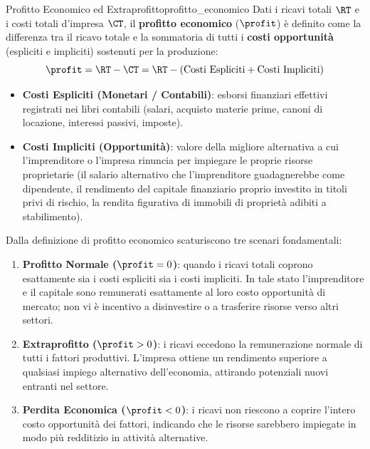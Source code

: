\begin{definizione}{Profitto Economico ed Extraprofitto}{profitto_economico}
Dati i ricavi totali $\RT$ e i costi totali d'impresa $\CT$, il \textbf{profitto economico} ($\profit$) è definito come la differenza tra il ricavo totale e la sommatoria di tutti i \textbf{costi opportunità} (espliciti e impliciti) sostenuti per la produzione:
\begin{equation}
    \profit = \RT - \CT = \RT - (\text{Costi Espliciti} + \text{Costi Impliciti})
\end{equation}
\begin{itemize}
    \item \textbf{Costi Espliciti (Monetari / Contabili)}: esborsi finanziari effettivi registrati nei libri contabili (salari, acquisto materie prime, canoni di locazione, interessi passivi, imposte).
    \item \textbf{Costi Impliciti (Opportunità)}: valore della migliore alternativa a cui l'imprenditore o l'impresa rinuncia per impiegare le proprie risorse proprietarie (il salario alternativo che l'imprenditore guadagnerebbe come dipendente, il rendimento del capitale finanziario proprio investito in titoli privi di rischio, la rendita figurativa di immobili di proprietà adibiti a stabilimento).
\end{itemize}
\end{definizione}

\begin{osservazione}
Dalla definizione di profitto economico scaturiscono tre scenari fondamentali:
\begin{enumerate}
    \item \textbf{Profitto Normale ($\profit = 0$)}: quando i ricavi totali coprono esattamente sia i costi espliciti sia i costi impliciti. In tale stato l'imprenditore e il capitale sono remunerati esattamente al loro costo opportunità di mercato; non vi è incentivo a disinvestire o a trasferire risorse verso altri settori.
    \item \textbf{Extraprofitto ($\profit > 0$)}: i ricavi eccedono la remunerazione normale di tutti i fattori produttivi. L'impresa ottiene un rendimento superiore a qualsiasi impiego alternativo dell'economia, attirando potenziali nuovi entranti nel settore.
    \item \textbf{Perdita Economica ($\profit < 0$)}: i ricavi non riescono a coprire l'intero costo opportunità dei fattori, indicando che le risorse sarebbero impiegate in modo più redditizio in attività alternative.
\end{enumerate}
\end{osservazione}

